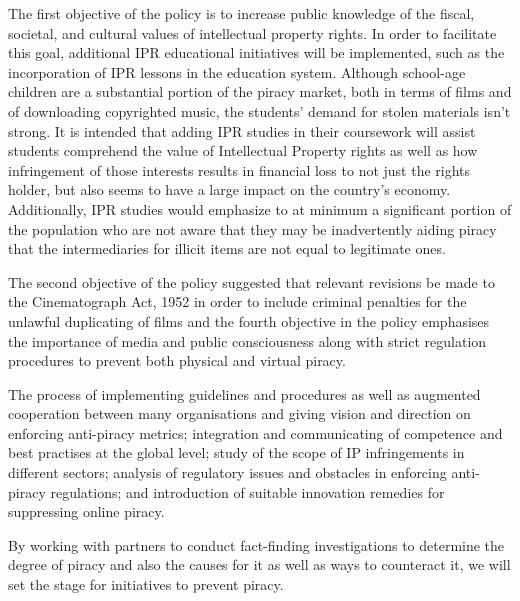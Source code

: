 \begin{multicols}{2}
\noi
The first objective of the policy is to increase public knowledge of the fiscal, societal, and
cultural values of intellectual property rights. In order to facilitate this goal, additional IPR
educational initiatives will be implemented, such as the incorporation of IPR lessons in the
education system. Although school-age children are a substantial portion of the piracy
market, both in terms of films and of downloading copyrighted music, the students’ demand
for stolen materials isn't strong. It is intended that adding IPR studies in their coursework will
assist students comprehend the value of Intellectual Property rights as well as how
infringement of those interests results in financial loss to not just the rights holder, but also
seems to have a large impact on the country's economy. Additionally, IPR studies would
emphasize to at minimum a significant portion of the population who are not aware that they
may be inadvertently aiding piracy that the intermediaries for illicit items are not equal to
legitimate ones.

\vspace{-.1cm}

\noi
The second objective of the policy suggested that relevant revisions be made to the
Cinematograph Act, 1952 in order to include criminal penalties for the unlawful duplicating
of films and the fourth objective in the policy emphasises the importance of media and public
consciousness along with strict regulation procedures to prevent both physical and virtual
piracy.

\vspace{-.1cm}

\noi
The process of implementing guidelines and procedures as well as augmented cooperation
between many organisations and giving vision and direction on enforcing anti-piracy metrics;
integration and communicating of competence and best practises at the global level; study of
the scope of IP infringements in different sectors; analysis of regulatory issues and obstacles
in enforcing anti-piracy regulations; and introduction of suitable innovation remedies for
suppressing online piracy.

\vspace{-.1cm}

\noi
By working with partners to conduct fact-finding investigations to determine the degree of
piracy and also the causes for it as well as ways to counteract it, we will set the stage for
initiatives to prevent piracy.



\end{multicols}
